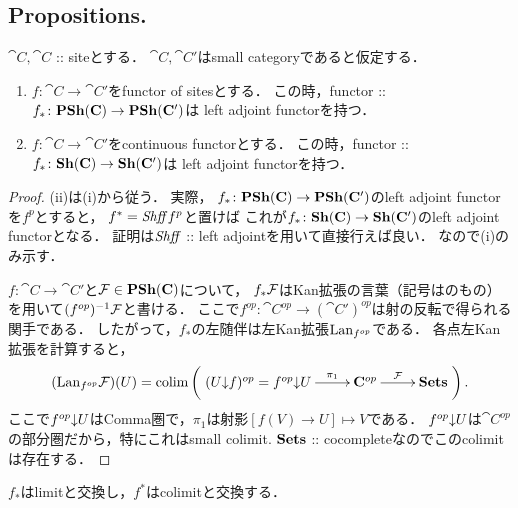 \documentclass[a4paper, dvipdfmx]{jsarticle}
\begin{document}
\subsection{Propositions.}
\begin{Prop}
    $\cat{C}, \cat{C}$ :: siteとする．
    $\cat{C}, \cat{C}'$はsmall categoryであると仮定する．
    \begin{enumerate}[label=(\roman*)]
    \item
    $f \colon \cat{C} \to \cat{C}'$をfunctor of sitesとする．
    この時，functor :: $f_* \colon \mathbf{PSh}(\mathbf{C}) \to \mathbf{PSh}(\mathbf{C}')$は
    left adjoint functorを持つ．
    
    \item
    $f \colon \cat{C} \to \cat{C}'$をcontinuous functorとする．
    この時，functor :: $f_* \colon \mathbf{Sh}(\mathbf{C}) \to \mathbf{Sh}(\mathbf{C}')$は
    left adjoint functorを持つ．
    \end{enumerate}
\end{Prop}

\begin{proof}
    (ii)は(i)から従う．
    実際，
    $f_* \colon \mathbf{PSh}(\mathbf{C}) \to \mathbf{PSh}(\mathbf{C}')$のleft adjoint functorを$f^p$とすると，
    $f^*=\mathit{Shff} f^p$と置けば
    これが$f_* \colon \mathbf{Sh}(\mathbf{C}) \to \mathbf{Sh}(\mathbf{C}')$のleft adjoint functorとなる．
    証明は$\mathit{Shff}$ :: left adjointを用いて直接行えば良い．
    なので(i)のみ示す．

    $f \colon \cat{C} \to \cat{C}'$と$\mathcal{F} \in \mathbf{PSh}(\mathbf{C})$について，
    $f_* \mathcal{F}$はKan拡張の言葉（記号は\cite{CWM}のもの）を用いて$(f^{op})^{-1} \mathcal{F}$と書ける．
    ここで$f^{op} \colon \cat{C}^{op} \to (\cat{C}')^{op}$は射の反転で得られる関手である．
    したがって，$f_*$の左随伴は左Kan拡張$\mathrm{Lan}_{f^{op}}$である．
    各点左Kan拡張を計算すると，
    \[ (\Lan_{f^{op}}\shF)(U)=\Colim\left(\xymatrix{
        (\Comma{U}{f})^{op}=\Comma{f^{op}}{U} \ar[r]^-{\pi_1}& \cat{C}^{op} \ar[r]^-{\shF}& \Sets
    }\right). \]
    ここで$f^{op}{\downarrow}U$はComma圏で，$\pi_1$は射影$[f(V) \to U] \mapsto V$である．
    $f^{op}{\downarrow}U$は$\cat{C}^{op}$の部分圏だから，特にこれはsmall colimit.
    $\mathbf{Sets}$ :: cocompleteなのでこのcolimitは存在する．
\end{proof}

\begin{Cor}
    $f_*$はlimitと交換し，$f^*$はcolimitと交換する．
\end{Cor}

\end{document}
